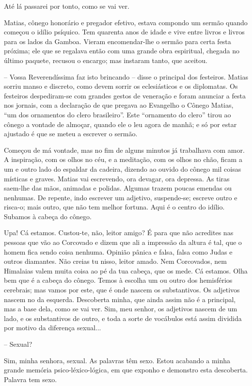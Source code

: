 Até lá passarei por tonto, como se vai ver.

Matias, cônego honorário e pregador efetivo, estava compondo um sermão
quando começou o idílio psíquico. Tem quarenta anos de idade e vive
entre livros e livros para os lados da Gamboa. Vieram encomendar-lhe o
sermão para certa festa próxima; ele que se regalava então com uma
grande obra espiritual, chegada no último paquete, recusou o encargo;
mas instaram tanto, que aceitou.

-- Vossa Reverendíssima faz isto brincando -- disse o principal dos
festeiros. Matias sorriu manso e discreto, como devem sorrir os
eclesiásticos e os diplomatas. Os festeiros despediram-se com grandes
gestos de veneração e foram anunciar a festa nos jornais, com a
declaração de que pregava ao Evangelho o Cônego Matias, ``um dos
ornamentos do clero brasileiro''. Este ``ornamento do clero'' tirou ao
cônego a vontade de almoçar, quando ele o leu agora de manhã; e só por
estar ajustado é que se meteu a escrever o sermão.

Começou de má vontade, mas no fim de alguns minutos já trabalhava com
amor. A inspiração, com os olhos no céu, e a meditação, com os olhos no
chão, ficam a um e outro lado do espaldar da cadeira, dizendo ao ouvido
do cônego mil coisas místicas e graves. Matias vai escrevendo, ora
devagar, ora depressa. As tiras saem-lhe das mãos, animadas e polidas.
Algumas trazem poucas emendas ou nenhumas. De repente, indo escrever um
adjetivo, suspende-se; escreve outro e risca-o; mais outro, que não tem
melhor fortuna. Aqui é o centro do idílio. Subamos à cabeça do cônego.

Upa! Cá estamos. Custou-te, não, leitor amigo? É para que não acredites
nas pessoas que vão ao Corcovado e dizem que ali a impressão da altura é
tal, que o homem fica sendo coisa nenhuma. Opinião pânica e falsa, falsa
como Judas e outros diamantes. Não creias tu nisso, leitor amado. Nem
Corcovados, nem Himalaias valem muita coisa ao pé da tua cabeça, que os
mede. Cá estamos. Olha bem que é a cabeça do cônego. Temos à escolha um
ou outro dos hemisférios cerebrais; mas vamos por este, que é onde
nascem os substantivos. Os adjetivos nascem no da esquerda. Descoberta
minha, que ainda assim não é a principal, mas a base dela, como se vai
ver. Sim, meu senhor, os adjetivos nascem de um lado, e os substantivos
de outro, e toda a sorte de vocábulos está assim dividida por motivo da
diferença sexual...

-- Sexual?

Sim, minha senhora, sexual. As palavras têm sexo. Estou acabando a minha
grande memória psico-léxico-lógica, em que exponho e demonstro esta
descoberta. Palavra tem sexo.

